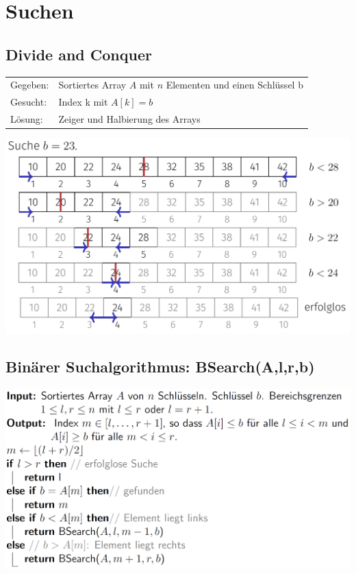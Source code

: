 \section{Suchen}
\vspace{-4pt}
\begin{sectionbox}
\subsection{Divide and Conquer}\smallskip
\begin{tabular*}{\columnwidth}{@{\extracolsep\fill}ll@{}}
Gegeben: & Sortiertes Array $A$ mit $n$ Elementen und einen Schlüssel b \\
Gesucht: & Index k mit $A[k]=b$ \\
Lösung: & Zeiger und Halbierung des Arrays\\
\end{tabular*}

\begin{center}
    \includegraphics[width = 0.6\columnwidth]{../img/DaQ.png}
\end{center}\par\smallskip
\end{sectionbox}
\vspace{-4pt}
\begin{sectionbox}
\subsection{Binärer Suchalgorithmus: BSearch(A,l,r,b)}\smallskip
\begin{center}
    \includegraphics[width = \columnwidth]{../img/BSearch.png}
\end{center}\par\smallskip
\end{sectionbox}